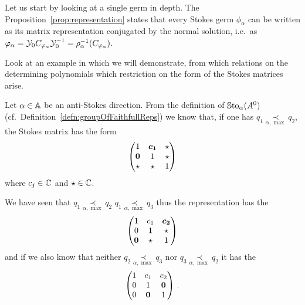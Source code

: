 Let us start by looking at a single germ in depth.
The Proposition~\ref{prop:representation} states that every Stokes germ
$\phi_\alpha$ can be written as its matrix representation conjugated by the
normal solution, i.e.\ as $\varphi_\alpha=\mathcal{Y}_{0}C_{\varphi_\alpha}\mathcal{Y}_{0}^{-1}
=\rho_{\alpha}^{-1}(C_{\varphi_\alpha})$.

Look at an example in which we will demonstrate, from which relations on the
determining polynomials which restriction on the form of the Stokes matrices
arise.
\begin{exmp}
  Let $\alpha\in\mathbb{A}$ be an anti-Stokes direction.
  From the definition of $\operatorname{\mathbb{S}to}_\alpha(A^0)$ (cf.\
  Definition~\ref{defn:groupOfFaithfullReps}) we know that, if one has
  $q_1 \underset{\alpha,\max}{\prec} q_2$, the Stokes matrix has the form
  \[
    \begin{pmatrix}
      1 & \text{\boldmath$c_1$} & \star
    \\\text{\boldmath$0$} & 1 & \star
    \\\star & \star & 1
    \end{pmatrix}
  \]
  where $c_j\in\mathbb{C}$ and $\star\in\mathbb{C}$.

  We have seen that $q_1 \underset{\alpha,\max}{\prec} q_2$ \Rightarrow{}
  $q_1 \underset{\alpha,\max}{\prec} q_3$ thus the representation has the
  \rewrite{form}
  \[
    \begin{pmatrix}
      1 & c_1 & \text{\boldmath$c_2$}
    \\0 & 1 & \star
    \\\text{\boldmath$0$} & \star & 1
    \end{pmatrix}
  \]
  and if we also know that neither $q_2 \underset{\alpha,\max}{\prec} q_3$ nor
  $q_3 \underset{\alpha,\max}{\prec} q_2$ it has the \rewrite{form}
  \[
    \begin{pmatrix}
      1 & c_1 & c_2
    \\0 & 1 & \text{\boldmath$0$}
    \\0 & \text{\boldmath$0$} & 1
    \end{pmatrix}\,.
  \]
  \begin{comment}
    We also know that every matrix of this \rewrite{form} is a representation
    to some Stokes germ.
    Thus we have an isomorphism
    \begin{align*}
      \vartheta_\alpha:\C^2 &\longrightarrow \SSto_\alpha(A^0)
    \\(c_1,c_2)&\longmapsto
      \begin{pmatrix}
        1 & c_1 & c_2
      \\0 & 1 & 0
      \\0 & 0 & 1
      \end{pmatrix}
    \end{align*}
  \end{comment}
\end{exmp}
